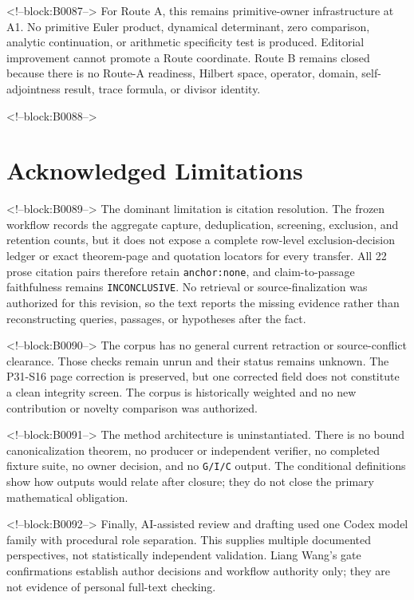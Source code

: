 \documentclass[11pt]{article}
\begin{document}
<!--block:B0087-->
For Route A, this remains primitive-owner infrastructure at A1. No
primitive Euler product, dynamical determinant, zero comparison,
analytic continuation, or arithmetic specificity test is produced.
Editorial improvement cannot promote a Route coordinate. Route B remains
closed because there is no Route-A readiness, Hilbert space, operator,
domain, self-adjointness result, trace formula, or divisor identity.

<!--block:B0088-->
\hypertarget{8-acknowledged-limitations}{%
\section{Acknowledged
Limitations}\label{8-acknowledged-limitations}}

<!--block:B0089-->
The dominant limitation is citation resolution. The frozen workflow records
the aggregate capture, deduplication, screening, exclusion, and retention
counts, but it does not expose a complete row-level exclusion-decision ledger
or exact theorem-page and quotation locators for every transfer. All 22 prose
citation pairs therefore retain \texttt{anchor:none}, and claim-to-passage
faithfulness remains \texttt{INCONCLUSIVE}. No retrieval or source-finalization
was authorized for this revision, so the text reports the missing evidence
rather than reconstructing queries, passages, or hypotheses after the fact.

<!--block:B0090-->
The corpus has no general current retraction or source-conflict
clearance. Those checks remain unrun and their status remains unknown.
The P31-S16 page correction is
preserved, but one corrected field does not constitute a clean integrity
screen. The corpus is historically weighted and no new contribution or
novelty comparison was authorized.

<!--block:B0091-->
The method architecture is uninstantiated. There is no bound
canonicalization theorem, no producer or independent verifier, no
completed fixture suite, no owner decision, and no \texttt{G/I/C}
output. The conditional definitions show how outputs would relate after
closure; they do not close the primary mathematical obligation.

<!--block:B0092-->
Finally, AI-assisted review and drafting used one Codex model family
with procedural role separation. This supplies multiple documented
perspectives, not statistically independent validation. Liang Wang's
gate confirmations establish author decisions and workflow authority
only; they are not evidence of personal full-text checking.
\end{document}
